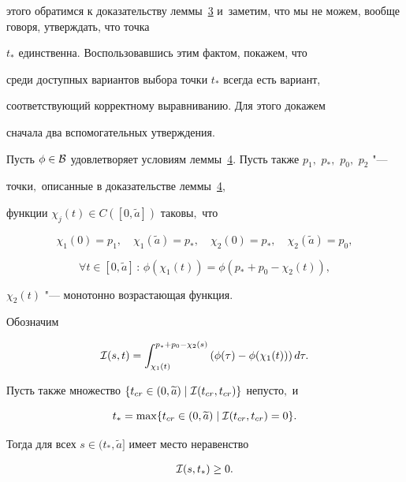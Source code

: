 этого обратимся к доказательству леммы~\hyperlink{palin:lemma3}{3} и~заметим, что мы не можем, вообще говоря, утверждать, что точка

$t_*$ единственна. Воспользовавшись этим фактом, покажем, что

среди доступных вариантов выбора точки $t_*$ всегда есть вариант,

соответствующий корректному выравниванию. Для этого докажем

сначала два вспомогательных утверждения.



\smallskip



\hypertarget{palin:lemma5}{}



\begin{lemma}Пусть $\phi\in{\cal B}$ удовлетворяет условиям леммы~{\rm \hyperlink{palin:lemma4}{4}.} Пусть также $p_1,$ $p_*,$ $p_0,$ $p_2$ "---

точки$,$ описанные в доказательстве леммы~{\rm \hyperlink{palin:lemma4}{4},}

функции $\chi_j(t)\in C([0,\widetilde{a}])$ таковы$,$ что

$$

\chi_1(0)=p_1,\quad \chi_1(\widetilde{a})=p_*,\quad \chi_2(0)=p_*,\quad \chi_2(\widetilde{a})=p_0,

$$

$$

\forall

t\in[0,\widetilde{a}]\,:\,\phi(\chi_1(t))=\phi(p_*+p_0-\chi_2(t)),

$$

$\chi_2(t)$ "--- монотонно возрастающая функция. 



Обозначим

\begin{gather}

{\cal

I}(s,t)=\int _{\chi_1(t)}^{p_*+p_0-\chi_2(s)}\left(\phi(\tau)-\phi(\chi_1(t))\right)d\tau.\label{eq-Ist-defi}

\end{gather}

Пусть также множество $\{t_{cr}\in(0,\widetilde{a})\mid {\cal I}(t_{cr},t_{cr})\}$ непусто$,$ и

$$t_*=\max\{t_{cr}\in(0,\widetilde{a})\mid {\cal I}(t_{cr},t_{cr})=0\}.$$ 



Тогда для всех $s\in(t_*,\widetilde{a}]$ имеет место неравенство

\begin{gather}

{\cal I}(s,t_*)\ge0.\label{eq-Ist-ineq1}

\end{gather}

\end{lemma}



